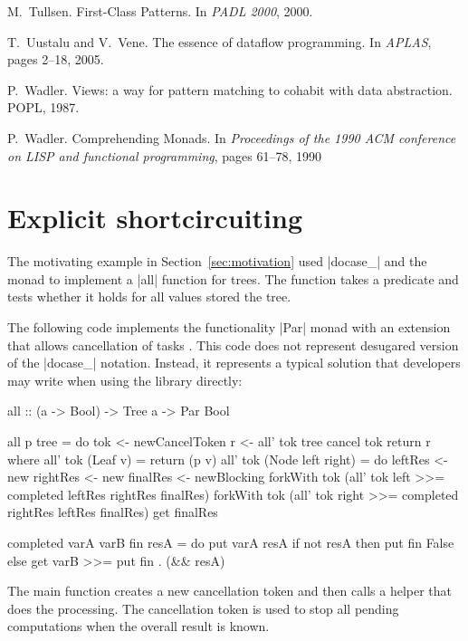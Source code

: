 \documentclass{sigplanconf}
\begin{document}
\begin{thebibliography}{37}
M.~Tullsen.
\newblock First-Class Patterns.
\newblock In \emph{PADL 2000}, 2000.

T.~Uustalu and V.~Vene.
\newblock The essence of dataflow programming.
\newblock In \emph{APLAS}, pages 2--18, 2005.

P.~Wadler.
\newblock Views: a way for pattern matching to cohabit with data abstraction.
\newblock POPL, 1987.

P.~Wadler.
\newblock Comprehending Monads.
\newblock In \emph{Proceedings of the 1990 ACM conference on LISP and
  functional programming}, pages 61--78, 1990

\end{thebibliography}


\appendix

\section{Explicit shortcircuiting}
\label{sec:appendix-shortcircuit}
The motivating example in Section~\ref{sec:motivation} used |docase_| and the  monad to 
implement a |all| function for trees. The function takes a predicate and tests whether it holds 
for all values stored the tree. 

The following code implements the functionality |Par| monad with an extension that allows cancellation 
of tasks \cite{parmonad-cancellation}. This code does not represent desugared version of the |docase_| 
notation. Instead, it represents a typical solution that developers may write when using the library 
directly:

\begin{code}
all :: (a -> Bool) -> Tree a -> Par Bool

all p tree = do
    tok <- newCancelToken
    r <- all' tok tree
    cancel tok 
    return r
  where 
    all' tok (Leaf v) = return (p v)
    all' tok (Node left right) = do
      leftRes <- new
      rightRes <- new
      finalRes <- newBlocking
      forkWith tok (all' tok left >>= 
        completed leftRes rightRes finalRes)
      forkWith tok (all' tok right >>= 
        completed rightRes leftRes finalRes)
      get finalRes
    
    completed varA varB fin resA = do
      put varA resA
      if not resA then put fin False
      else get varB >>= put fin . (&& resA)
\end{code}
The main function creates a new cancellation token and then calls a helper that does the 
processing. The cancellation token is used to stop all pending computations when 
the overall result is known. 
\end{document}
